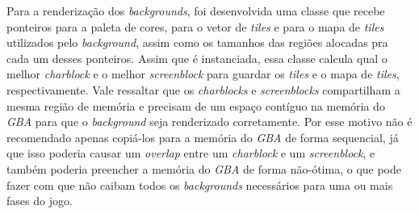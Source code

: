 Para a renderização dos \textit{backgrounds}, foi desenvolvida uma classe que recebe ponteiros para a paleta de cores, para o vetor de \textit{tiles} e para o mapa de \textit{tiles} utilizados pelo \textit{background}, assim como os tamanhos das regiões alocadas pra cada um desses ponteiros. Assim que é instanciada, essa classe calcula qual o melhor \textit{charblock} e o melhor \textit{screenblock} para guardar os \textit{tiles} e o mapa de \textit{tiles}, respectivamente. Vale ressaltar que os \textit{charblocks} e \textit{screenblocks} compartilham a mesma região de memória e precisam de um espaço contíguo na memória do \textit{GBA} para que o \textit{background} seja renderizado corretamente. Por esse motivo não é recomendado apenas copiá-los para a memória do \textit{GBA} de forma sequencial, já que isso poderia causar um \textit{overlap} entre um \textit{charblock} e um \textit{screenblock}, e também poderia preencher a memória do \textit{GBA} de forma não-ótima, o que pode fazer com que não caibam todos os \textit{backgrounds} necessários para uma ou mais fases do jogo.